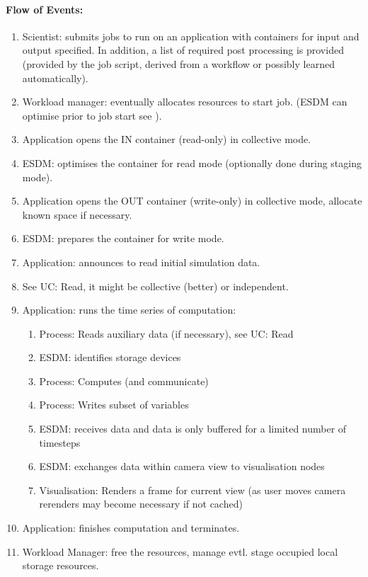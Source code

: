 \paragraph{Flow of Events:}
\begin{enumerate}
	\item Scientist: submits jobs to run on an application with containers for input and output specified. In addition, a list of required post processing is provided (provided by the job script, derived from a workflow or possibly learned automatically).
	\item Workload manager: eventually allocates resources to start job. (ESDM can optimise prior to job start see ).
	\item Application opens the IN container (read-only) in collective mode.
	\item ESDM: optimises the container for read mode (optionally done during staging mode).
	\item Application opens the OUT container (write-only) in collective mode, allocate known space if necessary.
	\item ESDM: prepares the container for write mode.
	\item Application: announces to read initial simulation data.
	\item See UC: Read, it might be collective (better) or independent.
	\item Application: runs the time series of computation:
	\begin{enumerate}
		\item Process: Reads auxiliary data (if necessary), see UC: Read
		\item ESDM: identifies storage devices
		\item Process: Computes (and communicate)
		\item Process: Writes subset of variables
		\item ESDM: receives data and data is only buffered for a limited number of timesteps
		\item ESDM: exchanges data within camera view to visualisation nodes
		\item Visualisation: Renders a frame for current view (as user moves camera rerenders may become necessary if not cached)
	\end{enumerate}
	\item Application: finishes computation and terminates.
	\item Workload Manager: free the resources, manage evtl. stage occupied local storage resources.
\end{enumerate}


